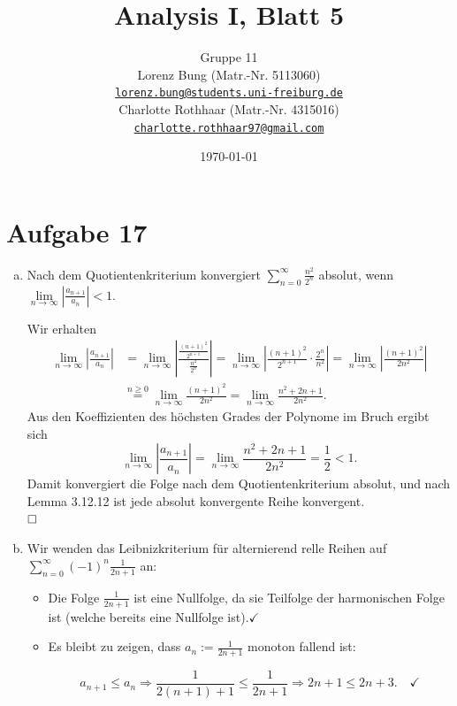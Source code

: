 \documentclass[12pt,a4paper]{article}
\title{Analysis I, Blatt 5}
\author{
    Gruppe 11\\
    Lorenz Bung (Matr.-Nr. 5113060)\\
    \href{mailto:lorenz.bung@students.uni-freiburg.de}{\texttt{lorenz.bung@students.uni-freiburg.de}}\\
    Charlotte Rothhaar (Matr.-Nr. 4315016)\\
    \href{mailto:charlotte.rothhaar97@gmail.com}{\texttt{charlotte.rothhaar97@gmail.com}}
}
\date{\today}
\newcommand{\qed}{\null\nobreak\hfill\square}
\newcommand{\textqed}{\\$\qed$}
\begin{document}
\maketitle


\section*{Aufgabe 17}

\begin{enumerate}[(a)]
    \item Nach dem Quotientenkriterium konvergiert $\sum\limits_{n=0}^{\infty} \frac{n^2}{2^n}$ absolut, wenn\\
    $\lim\limits_{n \to \infty} \left|\frac{a_{n+1}}{a_n}\right| < 1$.

    Wir erhalten
    \begin{align*}
    \lim\limits_{n \to \infty} \left|\frac{a_{n+1}}{a_n}\right|
    &= \lim\limits_{n \to \infty} \left|\frac{\frac{(n+1)^2}{2^{n+1}}}{\frac{n^2}{2^n}}\right|
    = \lim\limits_{n \to \infty} \left|\frac{(n+1)^2}{2^{n+1}} \cdot \frac{2^n}{n^2}\right|
    = \lim\limits_{n \to \infty} \left|\frac{(n+1)^2}{2n^2}\right|\\
    &\overset{n \geq 0}{=} \lim\limits_{n \to \infty} \frac{(n+1)^2}{2n^2}
    = \lim\limits_{n \to \infty} \frac{n^2 + 2n + 1}{2n^2}.
    \end{align*}
    Aus den Koeffizienten des höchsten Grades der Polynome im Bruch ergibt sich
    $$\lim\limits_{n \to \infty} \left|\frac{a_{n+1}}{a_n}\right| = \lim\limits_{n \to \infty} \frac{n^2 + 2n + 1}{2n^2} = \frac{1}{2} < 1.$$
    Damit konvergiert die Folge nach dem Quotientenkriterium absolut, und nach Lemma 3.12.12 ist jede absolut konvergente Reihe konvergent. \textqed

    \item Wir wenden das Leibnizkriterium für alternierend relle Reihen auf $\sum\limits_{n=0}^{\infty} (-1)^n \frac{1}{2n+1}$ an:

    \begin{itemize}
        \item Die Folge $\frac{1}{2n+1}$ ist eine Nullfolge, da sie Teilfolge der harmonischen Folge ist (welche bereits eine Nullfolge ist).\quad$\checkmark$
        \item Es bleibt zu zeigen, dass $a_n := \frac{1}{2n+1}$ monoton fallend ist:

        $$a_{n+1} \leq a_n \Rightarrow \frac{1}{2(n+1)+1} \leq \frac{1}{2n+1} \Rightarrow 2n+1 \leq 2n+3.\quad\checkmark$$


\end{itemize}
\end{enumerate}
\end{document}
